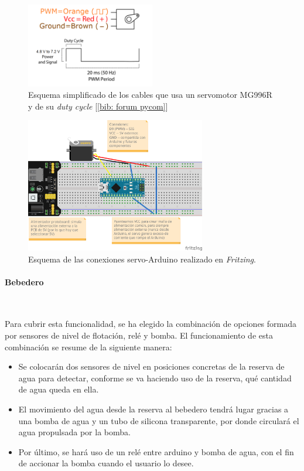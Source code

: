 \documentclass[12pt]{article}
\newcommand{\subsubsubsection}[1]{\paragraph{#1}\mbox{}\\}
\begin{document}
	\begin{figure}[h!]
		\begin{center}
			\includegraphics[width=0.5\textwidth]{img/servo_dutyCycle.png}
			\caption{Esquema simplificado de los cables que usa un servomotor MG996R y de su \textit{duty cycle} [\ref{bib: forum pycom}]}
			\label{Esquema conexiones servo}
		\end{center}
	\end{figure}
	
	\begin{figure}[h!]
		\begin{center}
			\includegraphics[width=0.7\textwidth]{img/servo_connections_v2_fritzing.png}
			\caption{Esquema de las conexiones servo-Arduino realizado en \textit{Fritzing}.}
			\label{Esquema conexiones servo Fritzing}
		\end{center}
	\end{figure}
	
	\pagebreak
	
	\subsubsubsection{Bebedero}
	\label{subsubsubsection: bebedero eleccion}
		
	\noindent Para cubrir esta funcionalidad, se ha elegido la combinación de opciones formada por sensores de nivel de flotación, relé y bomba. El funcionamiento de esta combinación se resume de la siguiente manera: 
	
	\begin{itemize}
		\item Se colocarán dos sensores de nivel en posiciones  concretas de la reserva de agua para detectar, conforme se va haciendo uso de la reserva, qué cantidad de agua queda en ella.
		\item El movimiento del agua desde la reserva al bebedero tendrá lugar gracias a una bomba de agua y un tubo de silicona transparente, por donde circulará el agua propulsada por la bomba.
		\item Por último, se hará uso de un relé entre arduino y bomba de agua, con el fin de accionar la bomba cuando el usuario lo desee.
	\end{itemize}
	
\end{document}
